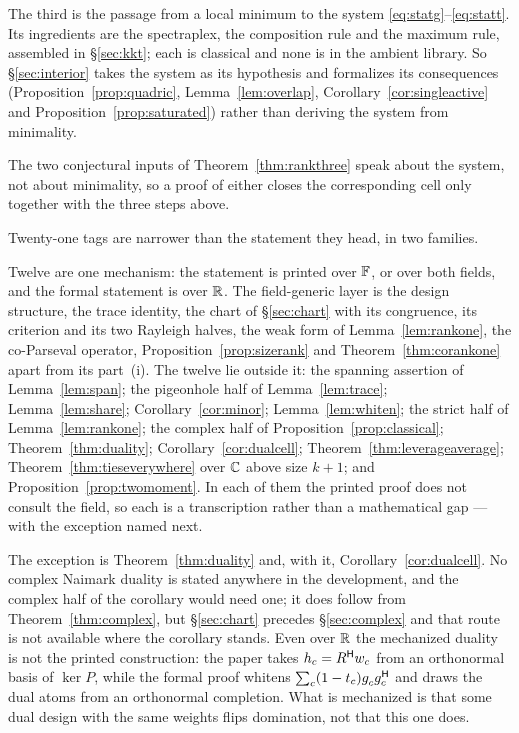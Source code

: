 The third is the passage from a local minimum to the system
\eqref{eq:statg}--\eqref{eq:statt}.  Its ingredients are the spectraplex,
the composition rule and the maximum rule, assembled in \S\ref{sec:kkt};
each is classical
\cite{Danskin1967,Overton1988,HiriartUrrutyYe1995,Clarke1990} and none is
in the ambient library.  So \S\ref{sec:interior} takes the system as its
hypothesis and formalizes its consequences
(Proposition~\ref{prop:quadric}, Lemma~\ref{lem:overlap},
Corollary~\ref{cor:singleactive} and Proposition~\ref{prop:saturated})
rather than deriving the system from minimality.

The two conjectural inputs of Theorem~\ref{thm:rankthree} speak about the
system, not about minimality, so a proof of either closes the corresponding
cell only together with the three steps above.

Twenty-one tags are narrower than the statement they head, in two families.

Twelve are one mechanism: the statement is printed over $\mathbb{F}$, or over both
fields, and the formal statement is over $\mathbb{R}$.  The field-generic layer is
the design structure, the trace identity, the chart of \S\ref{sec:chart}
with its congruence, its criterion and its two Rayleigh halves, the weak
form of Lemma~\ref{lem:rankone}, the co-Parseval operator,
Proposition~\ref{prop:sizerank} and Theorem~\ref{thm:corankone} apart from
its part~(i).  The twelve
lie outside it: the spanning assertion of Lemma~\ref{lem:span}; the
pigeonhole half of Lemma~\ref{lem:trace}; Lemma~\ref{lem:share};
Corollary~\ref{cor:minor}; Lemma~\ref{lem:whiten}; the strict half of
Lemma~\ref{lem:rankone}; the complex half of
Proposition~\ref{prop:classical}; Theorem~\ref{thm:duality};
Corollary~\ref{cor:dualcell}; Theorem~\ref{thm:leverageaverage};
Theorem~\ref{thm:tieseverywhere} over $\mathbb{C}$ above size $k+1$; and
Proposition~\ref{prop:twomoment}.  In each of them the printed proof does not
consult the field, so each is a transcription rather than a mathematical
gap --- with the exception named next.

The exception is Theorem~\ref{thm:duality} and, with it,
Corollary~\ref{cor:dualcell}.  No complex Naimark duality is stated anywhere
in the development, and the complex half of the corollary would need one; it
does follow from Theorem~\ref{thm:complex}, but \S\ref{sec:chart} precedes
\S\ref{sec:complex} and that route is not available where the corollary
stands.  Even over $\mathbb{R}$ the mechanized duality is not the printed
construction: the paper takes $h_c=R^{\mathsf{H}} w_c$ from an orthonormal basis of
$\ker P$, while the formal proof whitens
$\sum_c(1-t_c)g_c^{\vphantom{\mathsf{H}}}g_c\adj$ and draws the dual atoms
from an orthonormal completion.  What is mechanized is that some dual design
with the same weights flips domination, not that this one does.

